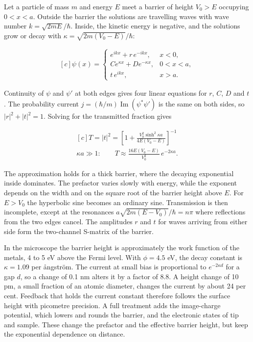 \documentclass[11pt,oneside]{book}
\newenvironment{centeredalign}{\[\begin{gathered}[c]}{\end{gathered}\]}
\begin{document}
Let a particle of mass \(m\) and energy \(E\) meet a barrier of height \(V_0>E\) occupying \(0<x<a\). Outside the barrier the solutions are travelling waves with wave number \(k=\sqrt{2mE}/\hbar\). Inside, the kinetic energy is negative, and the solutions grow or decay with \(\kappa=\sqrt{2m(V_0-E)}/\hbar\):

\begin{centeredalign}
\psi(x)=\begin{cases}e^{ikx}+r\,e^{-ikx}, & x<0,\\
C e^{\kappa x}+D e^{-\kappa x}, & 0<x<a,\\
t\,e^{ikx}, & x>a.\end{cases}
\end{centeredalign}

Continuity of \(\psi\) and \(\psi'\) at both edges gives four linear equations for \(r\), \(C\), \(D\) and \(t\). The probability current \(j=(\hbar/m)\operatorname{Im}(\psi^*\psi')\) is the same on both sides, so \(|r|^2+|t|^2=1\). Solving for the transmitted fraction gives

\begin{centeredalign}
T=|t|^2=\left[1+\frac{V_0^2\sinh^2\kappa a}{4E(V_0-E)}\right]^{-1}
\\ \kappa a\gg1:\qquad T\approx\frac{16E(V_0-E)}{V_0^2}\,e^{-2\kappa a}.
\end{centeredalign}

The approximation holds for a thick barrier, where the decaying exponential inside dominates. The prefactor varies slowly with energy, while the exponent depends on the width and on the square root of the barrier height above \(E\). For \(E>V_0\) the hyperbolic sine becomes an ordinary sine. Transmission is then incomplete, except at the resonances \(a\sqrt{2m(E-V_0)}/\hbar=n\pi\) where reflections from the two edges cancel. The amplitudes \(r\) and \(t\) for waves arriving from either side form the two-channel S-matrix of the barrier.

In the microscope the barrier height is approximately the work function of the metals, 4 to 5 eV above the Fermi level. With \(\phi=4.5\) eV, the decay constant is \(\kappa=1.09\) per ångström. The current at small bias is proportional to \(e^{-2\kappa d}\) for a gap \(d\), so a change of 0.1 nm alters it by a factor of 8.8. A height change of 10 pm, a small fraction of an atomic diameter, changes the current by about 24 per cent. Feedback that holds the current constant therefore follows the surface height with picometre precision. A full treatment adds the image-charge potential, which lowers and rounds the barrier, and the electronic states of tip and sample. These change the prefactor and the effective barrier height, but keep the exponential dependence on distance.
\end{document}
